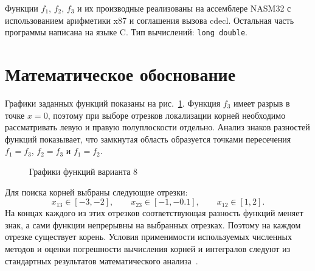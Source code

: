 \documentclass[a4paper,12pt,titlepage,finall]{article}
\begin{document}
Функции $f_1$, $f_2$, $f_3$ и их производные реализованы на ассемблере
NASM32 с использованием арифметики x87 и соглашения вызова cdecl.
Остальная часть программы написана на языке C. Тип вычислений:
\texttt{long double}.

\newpage

\section{Математическое обоснование}

Графики заданных функций показаны на рис.~\ref{plot1}. Функция $f_3$
имеет разрыв в точке $x=0$, поэтому при выборе отрезков локализации
корней необходимо рассматривать левую и правую полуплоскости отдельно.
Анализ знаков разностей функций показывает, что замкнутая область
образуется точками пересечения $f_1=f_3$, $f_2=f_3$ и $f_1=f_2$.

\begin{figure}[h]
\centering
{}
\caption{Графики функций варианта 8}
\label{plot1}
\end{figure}

Для поиска корней выбраны следующие отрезки:
\[
    x_{13}\in[-3,-2],\qquad
    x_{23}\in[-1,-0.1],\qquad
    x_{12}\in[1,2].
\]
На концах каждого из этих отрезков соответствующая разность функций
меняет знак, а сами функции непрерывны на выбранных отрезках. Поэтому
на каждом отрезке существует корень. Условия применимости используемых
численных методов и оценки погрешности вычисления корней и интегралов
следуют из стандартных результатов математического анализа~\cite{math}.
\end{document}
